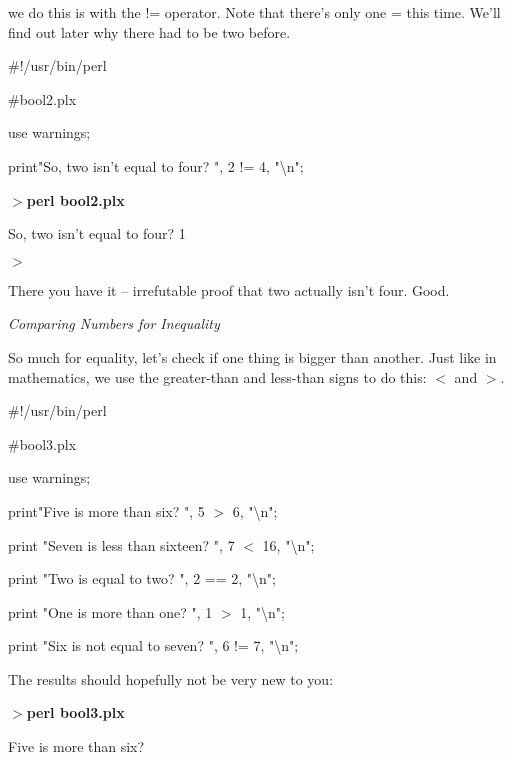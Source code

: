 \documentclass[a4paper,11pt]{book}
\begin{document}
\noindent we do this is with the != operator. Note that there's only one = this time. We'll find out later why there had to be two before.

\noindent 

\noindent 

\noindent \#!/usr/bin/perl

\noindent \#bool2.plx

\noindent use warnings;

\noindent print"So, two isn't equal to four? ", 2 != 4, "\textbackslash n";

\noindent 

\noindent $>$\textbf{perl bool2.plx}

\noindent So, two isn't equal to four? 1

\noindent $>$

\noindent 

\noindent There you have it -- irrefutable proof that two actually isn't four. Good.

\noindent 

\noindent \textit{Comparing Numbers for Inequality}

\noindent So much for equality, let's check if one thing is bigger than another. Just like in mathematics, we use the greater-than and less-than signs to do this: $<$ and $>$.

\noindent 

\noindent 

\noindent \#!/usr/bin/perl

\noindent \#bool3.plx

\noindent use warnings;

\noindent print"Five is more than six? ", 5 $>$  6, "\textbackslash n";

\noindent print "Seven is less than sixteen? ", 7 $<$ 16, "\textbackslash n";

\noindent print "Two is equal to two? ", 2 == 2, "\textbackslash n";

\noindent print "One is more than one? ", 1 $>$  1, "\textbackslash n";

\noindent print "Six is not equal to seven? ",  6 != 7, "\textbackslash n";

\noindent 

\noindent The results should hopefully not be very new to you:

\noindent 

\noindent $>$\textbf{perl bool3.plx}

\noindent Five is more than six?
\end{document}
